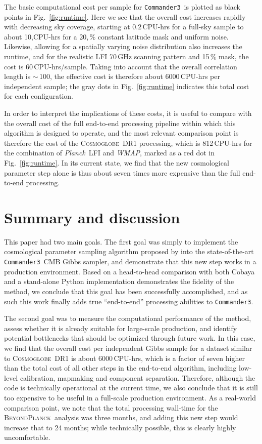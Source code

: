 \documentclass[twocolumn]{../common/aa}
\def\WMAP{\emph{WMAP}}
\def\Planck{\emph{Planck}}
\def\commanderthree{\texttt{Commander3}}
\newcommand{\BP}{\textsc{BeyondPlanck}}
\newcommand{\cosmoglobe}{\textsc{Cosmoglobe}}
\begin{document}
The basic computational cost per sample for \commanderthree\ is plotted as black points in Fig.~\ref{fig:runtime}. Here we see that the overall cost increases rapidly with decreasing sky coverage, starting at 0.2\,CPU-hrs for a full-sky sample to about 10,CPU-hrs for a 20,\,\% constant latitude mask and uniform noise. Likewise, allowing for a spatially varying noise distribution also increases the runtime, and for the realistic LFI 70\,GHz scanning pattern and 15\,\% mask, the cost is 60\,CPU-hrs/sample. Taking into account that the overall correlation length is $\sim$\,100, the effective cost is therefore about 6000\,CPU-hrs per independent sample; the gray dots in Fig.~\ref{fig:runtime} indicates this total cost for each configuration.

In order to interpret the implications of these costs, it is useful to compare with the overall cost of the full end-to-end processing pipeline within which this algorithm is designed to operate, and the most relevant comparison point is therefore the cost of the \cosmoglobe\ DR1 processing, which is 812\,CPU-hrs for the combination of \Planck\ LFI and \WMAP, marked as a red dot in Fig.~\ref{fig:runtime}. In its current state, we find that the new cosmological parameter step alone is thus about seven times more expensive than the full end-to-end processing. 

\section{Summary and discussion}
\label{sec:conclusions}

This paper had two main goals. The first goal was simply to implement the cosmological parameter sampling algorithm proposed by \citet{racine:2016} into the state-of-the-art \commanderthree\ CMB Gibbs sampler, and demonstrate that this new step works in a production environment. Based on a head-to-head comparison with both Cobaya and a stand-alone Python implementation demonstrates the fidelity of the method, we conclude that this goal has been successfully accomplished, and as such this work finally adds true ``end-to-end'' processing abilities to \commanderthree. 

The second goal was to measure the computational performance of the method, assess whether it is already suitable for large-scale production, and identify potential bottlenecks that should be optimized through future work. In this case, we find that the overall cost per independent Gibbs sample for a dataset similar to \cosmoglobe\ DR1 is about 6000\,CPU-hrs, which is a factor of seven higher than the total cost of all other steps in the end-to-end algorithm, including low-level calibration, mapmaking and component separation. Therefore, although the code is technically operational at the current time, we also conclude that it is still too expensive to be useful in a full-scale production environment. As a real-world comparison point, we note that the total processing wall-time for the \BP\ analysis was three months, and adding this new step would increase that to 24 months; while technically possible, this is clearly highly uncomfortable.
\end{document}
